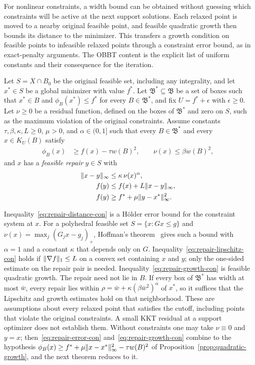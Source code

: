 For nonlinear constraints, a width bound can be obtained without guessing
which constraints will be active at the next support solutions. Each
relaxed point is moved to a nearby original feasible point, and feasible
quadratic growth then bounds its distance to the minimizer. This transfers
a growth condition on feasible points to infeasible relaxed points through
a constraint error bound, as in exact-penalty arguments. The OBBT content
is the explicit list of uniform constants and their consequence for the
iteration.

Let $S=X\cap B_0$ be the original feasible set, including any
integrality, and let $x^*\in S$ be a global minimizer with value $f^*$. Let
$\mathfrak B^*\subseteq\mathfrak B$ be a set of boxes such that
$x^*\in B$ and $\phi_B(x^*)\le f^*$ for every $B\in\mathfrak B^*$, and fix
$U=f^*+\epsilon$ with $\epsilon\ge0$. Let $\nu\ge0$ be a residual
function, defined on the boxes of $\mathfrak B^*$ and zero on $S$, such as
the maximum violation of the original constraints. Assume constants
$\tau,\beta,\kappa,L\ge0$, $\mu>0$, and $\alpha\in(0,1]$ such that every
$B\in\mathfrak B^*$ and every $x\in K_U(B)$ satisfy
\begin{align}
 \phi_B(x)&\ge f(x)-\tau w(B)^2,\qquad \nu(x)\le\beta w(B)^2,
 \label{eq:repair-error-con}
\end{align}
and $x$ has a \emph{feasible repair} $y\in S$ with
\begin{align}
 \lVert x-y\rVert_\infty&\le\kappa\,\nu(x)^\alpha,\label{eq:repair-distance-con}\\
 f(y)&\le f(x)+L\lVert x-y\rVert_\infty,\label{eq:repair-lipschitz-con}\\
 f(y)&\ge f^*+\mu\lVert y-x^*\rVert_\infty^2.\label{eq:repair-growth-con}
\end{align}

Inequality~\eqref{eq:repair-distance-con} is a H\"older error bound for the
constraint system at $x$. For a polyhedral feasible set
$S=\{x:Gx\le g\}$ and $\nu(x)=\max_j(G_jx-g_j)_+$, Hoffman's
theorem~\cite{hoffman1952-on-approximate-solutions-of-systems} gives such
a bound with $\alpha=1$ and a constant $\kappa$ that depends only on $G$.
Inequality~\eqref{eq:repair-lipschitz-con} holds if $\lVert \nabla f\rVert_1\le L$
on a convex set containing $x$ and $y$; only the one-sided estimate on the
repair pair is needed. Inequality~\eqref{eq:repair-growth-con} is feasible
quadratic growth. The repair need not lie in $B$. If every box of
$\mathfrak B^*$ has width at most $\bar w$, every repair lies within
$\rho=\bar w+\kappa(\beta\bar w^2)^\alpha$ of $x^*$, so it suffices that the
Lipschitz and growth estimates hold on that neighborhood. These are
assumptions about every relaxed point that satisfies the cutoff, including
points that violate the original constraints. A small KKT residual at a
support optimizer does not establish them. Without constraints one may take
$\nu\equiv0$ and $y=x$; then~\eqref{eq:repair-error-con}
and~\eqref{eq:repair-growth-con} combine to the hypothesis
$\phi_B(x)\ge f^*+\mu\lVert x-x^*\rVert_\infty^2-\tau w(B)^2$ of
Proposition~\ref{prop:quadratic-growth}, and the next theorem reduces to it.

